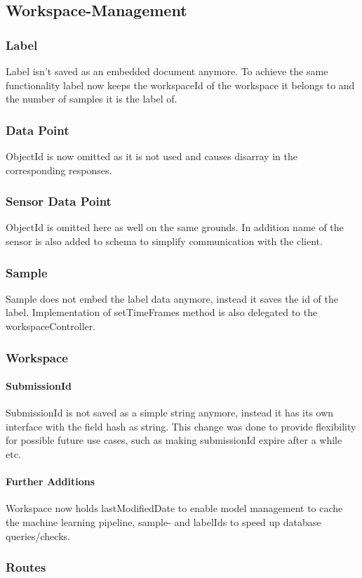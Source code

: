 \subsection{Workspace-Management}
\subsubsection{Label}
Label isn't saved as an embedded document anymore. To achieve the same functionality label now keeps the workspaceId of the workspace it belongs to and the number of samples it is the label of.
\subsubsection{Data Point}
ObjectId is now omitted as it is not used and causes disarray in the corresponding responses.
\subsubsection{Sensor Data Point}
ObjectId is omitted here as well on the same grounds. In addition name of the sensor is also added to schema to simplify communication with the client.
\subsubsection{Sample}
Sample does not embed the label data anymore, instead it saves the id of the label. Implementation of setTimeFrames method is also delegated to the workspaceController.
\subsubsection{Workspace}
\paragraph{SubmissionId} SubmissionId is not saved as a simple string anymore, instead it has its own interface with the field hash as string. This change was done to provide flexibility for possible future use cases, such as making submissionId expire after a while etc.
\paragraph{Further Additions} Workspace now holds lastModifiedDate to enable model management to cache the machine learning pipeline, sample- and labelIds to speed up database queries/checks.
\subsubsection{Routes}
